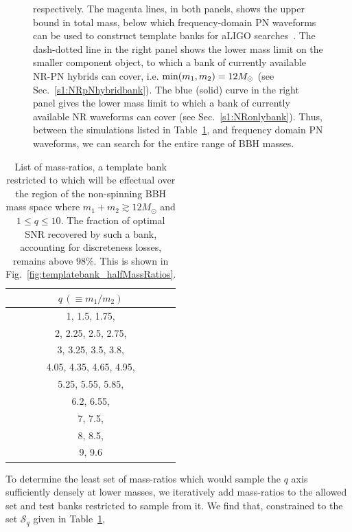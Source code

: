 \begin{figure}
\begin{center}
{  respectively. The magenta lines, in both panels, shows the upper bound 
  in total mass, below which frequency-domain PN waveforms can be used to construct template banks for aLIGO
  searches~\cite{CompTemplates2009,Brown:2012nn}. The dash-dotted line
  in the right panel shows the lower mass limit on the smaller component object,
  to which a bank of currently available NR-PN hybrids can cover, i.e.
  $\mathrm{min}(m_1,m_2)=12M_\odot$ (see Sec.~\ref{s1:NRpNhybridbank}). The blue (solid)
  curve in  the right panel gives the lower mass limit to which a bank of
  currently available NR waveforms can cover (see Sec.~\ref{s1:NRonlybank}).
  Thus, between the simulations listed in Table~\ref{table:fullqlist}, 
  and frequency domain PN waveforms, we can search for the entire range of 
  BBH masses.}
\end{center}
\end{figure}
\begin{table}
\begin{center}
\begin{tabular}{| c |}
\hline
$q\,(\equiv m_1/m_2)$ \\ \hline
1, 1.5, 1.75, \\
2, 2.25, 2.5, 2.75, \\
3, 3.25, 3.5, 3.8, \\
4.05, 4.35, 4.65, 4.95, \\
5.25, 5.55, 5.85, \\
6.2, 6.55, \\
7, 7.5, \\
8, 8.5, \\
9, 9.6 \\
\hline
\end{tabular}
\caption{List of mass-ratios, a template bank restricted to which will be effectual
over the region of the non-spinning BBH mass space where $m_1+m_2\gtrsim 12M_\odot$
and $1\leq q\leq 10$. The fraction of optimal SNR recovered by such a bank,
accounting for discreteness losses, remains above $98\%$. This is shown in
Fig.~\ref{fig:templatebank_halfMassRatios}.}
\label{table:fullqlist}
\end{center}
\end{table}
To determine the least set of mass-ratios which would sample the $q$ axis 
sufficiently densely at lower masses, we iteratively add mass-ratios to the 
allowed set and test banks restricted to sample from it. We find that, 
constrained to the set $\mathcal{S}_q$ given in Table~\ref{table:fullqlist},

